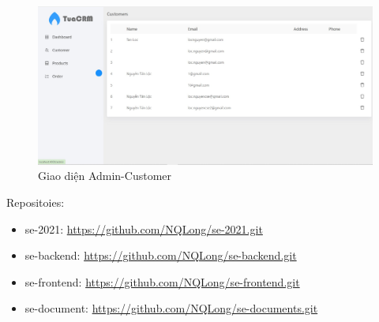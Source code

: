 \documentclass[a4paper]{article}
\begin{document}
\begin{figure}[!h]
    \begin{center}
        \includegraphics[scale=0.4]{Images/screen_flow/admin_customer.jpg}
    \end{center}
    \hspace{0.3cm}
    \caption{Giao diện Admin-Customer}
\end{figure}
\newpage
Repositoies:
\begin{itemize}
    \item se-2021: \url{https://github.com/NQLong/se-2021.git}
    \item se-backend: \url{https://github.com/NQLong/se-backend.git}
    \item se-frontend: \url{https://github.com/NQLong/se-frontend.git}
    \item se-document: \url{https://github.com/NQLong/se-documents.git}
    
\end{itemize}


\end{document}
